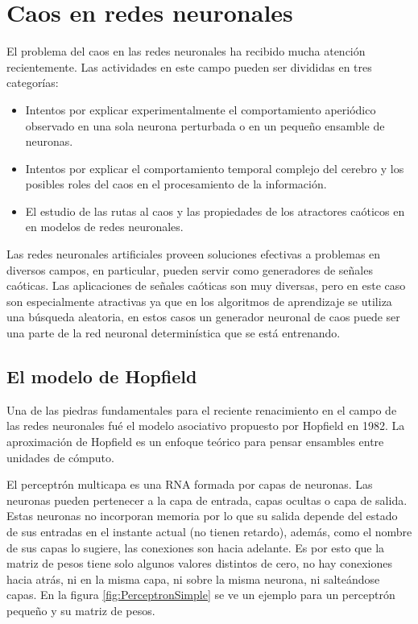 \section{Caos en redes neuronales}
\label{sec:RNA}

El problema del caos en las redes neuronales ha recibido mucha atención recientemente.
Las actividades en este campo pueden ser divididas en tres categorías:
\begin{itemize}
	\item Intentos por explicar experimentalmente el comportamiento aperiódico observado en una sola neurona perturbada o en un pequeño ensamble de neuronas.
	\item Intentos por explicar el comportamiento temporal complejo del cerebro y los posibles	roles del caos en el procesamiento de la información.
	\item El estudio de las rutas al caos y las propiedades de los atractores caóticos en en modelos de redes neuronales.
\end{itemize}

Las redes neuronales artificiales proveen soluciones efectivas a problemas en diversos campos, en particular, pueden servir como generadores de señales caóticas.
Las aplicaciones de señales caóticas son muy diversas, pero en este caso son especialmente atractivas ya que en los algoritmos de aprendizaje se utiliza una búsqueda aleatoria, en estos casos un generador neuronal de caos puede ser una parte de la red neuronal determinística que se está entrenando.

\subsection{El modelo de Hopfield}

Una de las piedras fundamentales para el reciente renacimiento en el campo de las redes neuronales fué el modelo asociativo propuesto por Hopfield en 1982.
La aproximación de Hopfield es un enfoque teórico para pensar ensambles entre unidades de cómputo.

El perceptrón multicapa es una RNA formada por capas de neuronas.
Las neuronas pueden pertenecer a la capa de entrada, capas ocultas o capa de salida.
Estas neuronas no incorporan memoria por lo que su salida depende del estado de sus entradas en el instante actual (no tienen retardo), además, como el nombre de sus capas lo sugiere, las conexiones son hacia adelante.
Es por esto que la matriz de pesos tiene solo algunos valores distintos de cero, no hay conexiones hacia atrás, ni en la misma capa, ni sobre la misma neurona,
ni salteándose capas.
En la figura \ref{fig:PerceptronSimple} se ve un ejemplo para un perceptrón pequeño y su matriz de pesos.

